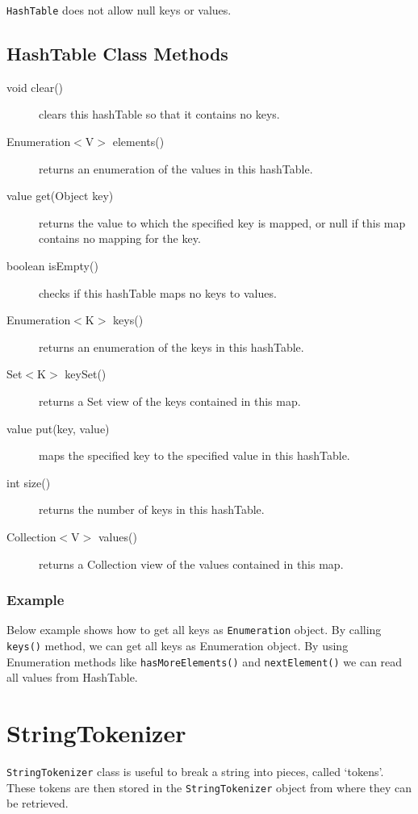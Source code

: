 \documentclass[11pt,a4paper]{article}
\begin{document}
\texttt{HashTable} does not allow null keys or values.

\subsection*{HashTable Class Methods}
\begin{description}
\item [void clear()] clears this hashTable so that it contains no keys.

\item [Enumeration$<$V$>$	elements()] returns an enumeration of the values in this hashTable.

\item [value get(Object key)] returns the value to which the specified key is mapped, or null if this map contains no mapping for the key.

\item [boolean isEmpty()] checks if this hashTable maps no keys to values.

\item [Enumeration$<$K$>$ keys()] returns an enumeration of the keys in this hashTable.

\item [Set$<$K$>$ keySet()] returns a Set view of the keys contained in this map.

\item [value put(key, value)] maps the specified key to the specified value in this hashTable.

\item [int size()] returns the number of keys in this hashTable.

\item [Collection$<$V$>$ values()] returns a Collection view of the values contained in this map.
\end{description}

\subsubsection*{Example}
Below example shows how to get all keys as \texttt{Enumeration} object. By calling \texttt{keys()} method, we can get all keys as Enumeration object. By using Enumeration methods like \texttt{hasMoreElements()} and \texttt{nextElement()} we can read all values from HashTable.



\section*{StringTokenizer}
\texttt{StringTokenizer} class is useful to break a string into pieces, called `tokens'. These tokens are then stored in the \texttt{StringTokenizer} object from where they can be retrieved. 
\end{document}
